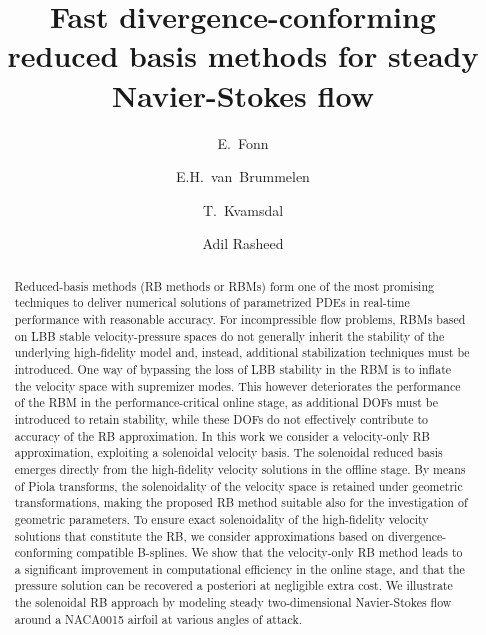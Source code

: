 \documentclass[onecolumn, twoside, a4paper, 11pt]{article}
\begin{document}
\title{Fast divergence-conforming reduced basis methods for steady Navier-Stokes flow}
\author[1]{E.~Fonn}
\author[2]{E.H.~van~Brummelen}
\author[1,3]{T.~Kvamsdal}
\author[1]{Adil Rasheed}

\maketitle

\begin{abstract}
  Reduced-basis methods (RB methods or RBMs) form one of the most promising techniques to
  deliver numerical solutions of parametrized PDEs in real-time performance
  with reasonable accuracy. For incompressible flow problems, RBMs based on LBB
  stable velocity-pressure spaces do not generally inherit the stability
  of the underlying high-fidelity model and, instead, additional stabilization techniques
  must be introduced. One way of bypassing the loss of LBB stability in the RBM is to
  inflate the velocity space with supremizer modes.%
  This however
  deteriorates the performance of the RBM in the performance-critical online stage, as
  additional DOFs must be introduced to retain stability, while these DOFs do not effectively
  contribute to accuracy of the RB approximation. In this work we consider a velocity-only
  RB approximation, exploiting a solenoidal velocity basis. The solenoidal reduced basis
  emerges directly from the high-fidelity velocity solutions in the offline stage. By means
  of Piola transforms, the solenoidality of the velocity space is retained under geometric
  transformations, making the proposed RB method suitable also for the investigation of
  geometric parameters. To ensure exact solenoidality of the high-fidelity velocity solutions
  that constitute the RB, we consider approximations based on divergence-conforming compatible
  B-splines. We show that the velocity-only RB method leads to a significant improvement in
  computational efficiency in the online stage, and that the pressure solution can be recovered
  a posteriori at negligible extra cost. We illustrate the solenoidal RB approach by modeling
  steady two-dimensional Navier-Stokes flow around a NACA0015 airfoil at various angles of attack.
\end{abstract}
\end{document}
